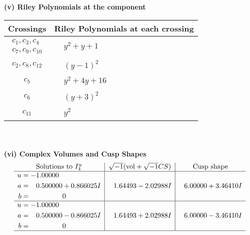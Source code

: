 \documentclass[1p]{elsarticle_modified}
\theoremstyle{definition}
\newcommand{\I}{\sqrt{-1}}
\begin{document}
\newpage\renewcommand{\arraystretch}{1}
\flushleft \textbf{(v) Riley Polynomials at the component}\newline \\
\begin{tabular}{m{50pt}|m{274pt}}
Crossings & \hspace{64pt}Riley Polynomials at each crossing \\
\hline $$\begin{aligned}c_{1},c_{3},c_{4}\\c_{7},c_{9},c_{10}\end{aligned}$$&$\begin{aligned}
&y^2+y+1
\end{aligned}$\\
\hline $$\begin{aligned}c_{2},c_{8},c_{12}\end{aligned}$$&$\begin{aligned}
&(y-1)^2
\end{aligned}$\\
\hline $$\begin{aligned}c_{5}\end{aligned}$$&$\begin{aligned}
&y^2+4 y+16
\end{aligned}$\\
\hline $$\begin{aligned}c_{6}\end{aligned}$$&$\begin{aligned}
&(y+3)^2
\end{aligned}$\\
\hline $$\begin{aligned}c_{11}\end{aligned}$$&$\begin{aligned}
&y^2
\end{aligned}$\\
\hline
\end{tabular}\\~\\
\newpage\flushleft \textbf{(vi) Complex Volumes and Cusp Shapes}
$$\begin{array}{c|c|c}  
\text{Solutions to }I^u_{4}& \I (\text{vol} + \sqrt{-1}CS) & \text{Cusp shape}\\
 \hline 
\begin{aligned}
u &= -1.00000\phantom{ +0.000000I} \\
a &= \phantom{-}0.500000 + 0.866025 I \\
b &= \phantom{-0.000000 } 0\end{aligned}
 & \phantom{-}1.64493 - 2.02988 I & \phantom{-}6.00000 + 3.46410 I \\ \hline\begin{aligned}
u &= -1.00000\phantom{ +0.000000I} \\
a &= \phantom{-}0.500000 - 0.866025 I \\
b &= \phantom{-0.000000 } 0\end{aligned}
 & \phantom{-}1.64493 + 2.02988 I & \phantom{-}6.00000 - 3.46410 I\\
 \hline 
 \end{array}$$\newpage\newpage\renewcommand{\arraystretch}{1}
\end{document}
